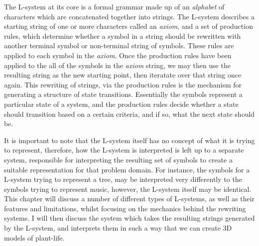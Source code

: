 \begin{flushleft}

The L-system at its core is a formal grammar made up of an \textit{alphabet} of characters which are concatenated together into strings. The L-system describes a starting string of one or more characters called an \textit{axiom}, and a set of production rules, which determine whether a symbol in a string should be rewritten with another terminal symbol or non-terminal string of symbols. These rules are applied to each symbol in the \textit{axiom}. Once the production rules have been applied to the all of the symbols in the \textit{axiom} string, we may then use the resulting string as the new starting point, then iteratate over that string once again. This rewriting of strings, via the production rules is the mechanism for generating a structure of state transitions. Essentially the symbols represent a particular state of a system, and the production rules decide whether a state should transition based on a certain criteria, and if so, what the next state should be. \\

\vspace{5mm}

It is important to note that the L-system itself has no concept of what it is trying to represent, therefore, how the L-system is interpreted is left up to a separate system, responsible for interpreting the resulting set of symbols to create a suitable representation for that problem domain. For instance, the symbols for a L-system trying to represent a tree, may be interpreted very differently to the symbols trying to represent music, however, the L-system itself may be identical. \\
This chapter will discuss a number of different types of L-systems, as well as their features and limitations, whilst focusing on the mechanics behind the rewriting systems. I will then discuss the system which takes the resulting strings generated by the L-system, and interprets them in such a way that we can create 3D models of plant-life. \\

\vspace{5mm} 


\end{flushleft}
